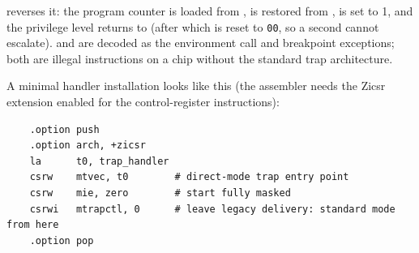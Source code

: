  reverses it: the program counter is loaded from ,  is restored from ,  is set to 1, and the privilege level returns to \ifprivumode{} (after which  is reset to \texttt{00}, so a second  cannot escalate)\fi.  and  are decoded as the environment call and breakpoint exceptions; both are illegal instructions on a chip without the standard trap architecture.

A minimal handler installation looks like this (the assembler needs the Zicsr extension enabled for the control-register instructions):

\begin{verbatim}
    .option push
    .option arch, +zicsr
    la      t0, trap_handler
    csrw    mtvec, t0        # direct-mode trap entry point
    csrw    mie, zero        # start fully masked
    csrwi   mtrapctl, 0      # leave legacy delivery: standard mode from here
    .option pop
\end{verbatim}

\ifprivumode
\newcommand{\privstripeA}{\rowcolor{tablehighlightcolor}}
\newcommand{\privstripeB}{}
\else
\newcommand{\privstripeA}{}
\newcommand{\privstripeB}{\rowcolor{tablehighlightcolor}}
\fi

